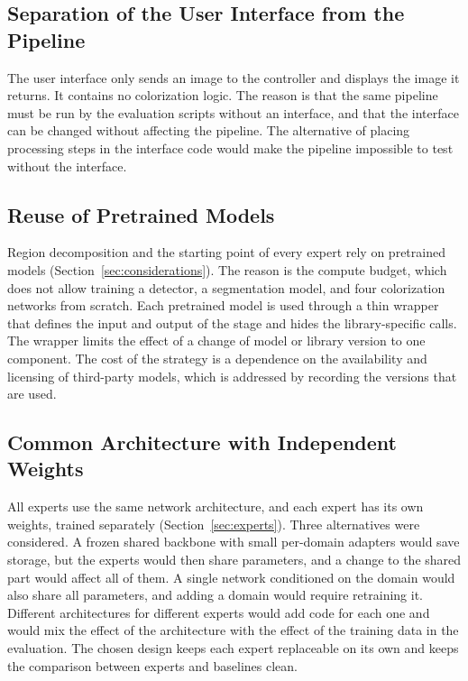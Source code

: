 \documentclass{FastFyp}
\begin{document}
\subsection{Separation of the User Interface from the Pipeline}

The user interface only sends an image to the controller and displays the image it returns. It contains no colorization logic. The reason is that the same pipeline must be run by the evaluation scripts without an interface, and that the interface can be changed without affecting the pipeline. The alternative of placing processing steps in the interface code would make the pipeline impossible to test without the interface.

\subsection{Reuse of Pretrained Models}

Region decomposition and the starting point of every expert rely on pretrained models (Section~\ref{sec:considerations}). The reason is the compute budget, which does not allow training a detector, a segmentation model, and four colorization networks from scratch. Each pretrained model is used through a thin wrapper that defines the input and output of the stage and hides the library-specific calls. The wrapper limits the effect of a change of model or library version to one component. The cost of the strategy is a dependence on the availability and licensing of third-party models, which is addressed by recording the versions that are used.

\subsection{Common Architecture with Independent Weights}

All experts use the same network architecture, and each expert has its own weights, trained separately (Section~\ref{sec:experts}). Three alternatives were considered. A frozen shared backbone with small per-domain adapters would save storage, but the experts would then share parameters, and a change to the shared part would affect all of them. A single network conditioned on the domain would also share all parameters, and adding a domain would require retraining it. Different architectures for different experts would add code for each one and would mix the effect of the architecture with the effect of the training data in the evaluation. The chosen design keeps each expert replaceable on its own and keeps the comparison between experts and baselines clean.
\end{document}
